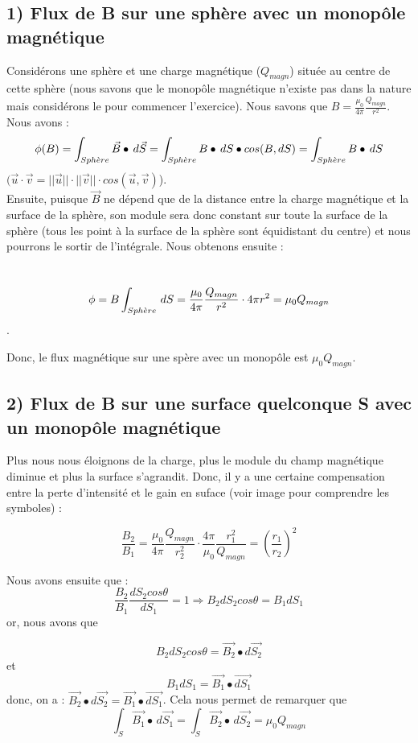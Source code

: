 \documentclass[12pt]{article}
\begin{document}
\subsection*{1) Flux de B sur une sphère avec un monopôle magnétique}
\noindent Considérons une sphère et une charge magnétique ($Q_{magn}$) située au centre de cette sphère (nous savons que le monopôle magnétique n'existe pas dans la nature mais considérons le pour commencer l'exercice). Nous savons que $B = \frac{\mu_0 }{4\pi} \frac{Q_{magn}}{r^2}$. Nous avons : $$\phi(B) = \int_{Sph\Grave{e}re} \Vec{B} \bullet \,d\Vec{S} = \int_{Sph\Grave{e}re} B \bullet \,dS \bullet cos(B, dS) = \int_{Sph\Grave{e}re} B \bullet \,dS$$ $(\Vec{u} \cdot \Vec{v} = ||\Vec{u}|| \cdot ||\Vec{v}|| \cdot cos(\Vec{u}, \Vec{v})$).
\\ Ensuite, puisque $\vec{B}$ ne dépend que de la distance entre la charge magnétique et la surface de la sphère, son module sera donc constant sur toute la surface de la sphère (tous les point à la surface de la sphère sont équidistant du centre) et nous pourrons le sortir de l'intégrale. Nous obtenons ensuite :

\\ $$\phi = B \int_{Sph\Grave{e}re} \,dS = \frac{\mu_0 }{4\pi} \frac{Q_{magn}}{r^2} \cdot 4\pi r^2 = \mu_0 Q_{magn}$$.

\noindent Donc, le flux magnétique sur une spère avec un monopôle est $\mu_0 Q_{magn}$.

\subsection*{2) Flux de B sur une surface quelconque S avec un monopôle magnétique}
\noindent Plus nous nous éloignons de la charge, plus le module du champ magnétique diminue et plus la surface s'agrandit. Donc, il y a une certaine compensation entre la perte d'intensité et le gain en suface (voir image pour comprendre les symboles) :

$$\frac{B_2}{B_1} = \frac{\mu_0 }{4\pi} \frac{Q_{magn}}{r_2^2} \cdot \frac{4\pi }{\mu_0} \frac{r_1^2}{Q_{magn}} =  (\frac{r_1}{r_2})^2$$ 

\noindent Nous avons ensuite que :
$$\frac{B_2}{B_1} \frac{dS_2 cos\theta}{dS_1} = 1 \Rightarrow B_2 dS_2 cos\theta = B_1 dS_1$$ or, nous avons que 

$$B_2 dS_2 cos\theta = \Vec{B_2} \bullet d\vec{S_2}$$ et $$B_1 dS_1 = \Vec{B_1} \bullet \vec{dS_1}$$ donc, on a : $\Vec{B_2} \bullet d\vec{S_2} = \Vec{B_1} \bullet \vec{dS_1}$. Cela nous permet de remarquer que $$\int_{S} \Vec{B_1} \bullet \,d\Vec{S_1} = \int_{S} \Vec{B_2} \bullet \,d\Vec{S_2} = \mu_0 Q_{magn}$$
\end{document}
